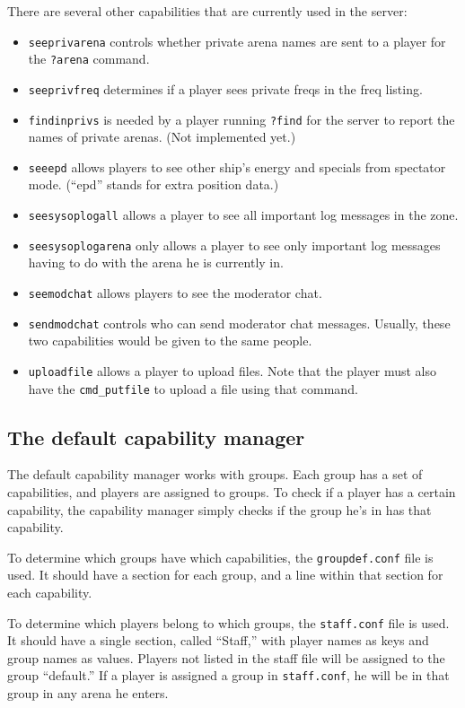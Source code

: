 \documentclass{article}
\begin{document}
There are several other capabilities that are currently used in the
server:

\begin{itemize}
\item{\texttt{seeprivarena}} controls whether private arena names are
sent to a player for the \verb/?arena/ command.
\item{\texttt{seeprivfreq}} determines if a player sees private freqs in
the freq listing.
\item{\texttt{findinprivs}} is needed by a player running \verb/?find/
for the server to report the names of private arenas. (Not implemented
yet.)
\item{\texttt{seeepd}} allows players to see other ship's energy and
specials from spectator mode. (``epd'' stands for extra position data.)
\item{\texttt{seesysoplogall}} allows a player to see all important log
messages in the zone.
\item{\texttt{seesysoplogarena}} only allows a player to see only
important log messages having to do with the arena he is currently in.
\item{\texttt{seemodchat}} allows players to see the moderator chat.
\item{\texttt{sendmodchat}} controls who can send moderator chat
messages. Usually, these two capabilities would be given to the same
people.
\item{\texttt{uploadfile}} allows a player to upload files. Note that
the player must also have the \texttt{cmd\_putfile} to upload a file
using that command.
\end{itemize}


\subsection{The default capability manager}

The default capability manager works with groups. Each group has a set
of capabilities, and players are assigned to groups. To check if a
player has a certain capability, the capability manager simply checks if
the group he's in has that capability.

To determine which groups have which capabilities, the
\verb/groupdef.conf/ file is used. It should have a section for each
group, and a line within that section for each capability.

To determine which players belong to which groups, the \verb/staff.conf/
file is used. It should have a single section, called ``Staff,'' with
player names as keys and group names as values. Players not listed in
the staff file will be assigned to the group ``default.'' If a player is
assigned a group in \verb/staff.conf/, he will be in that group in any
arena he enters.
\end{document}

